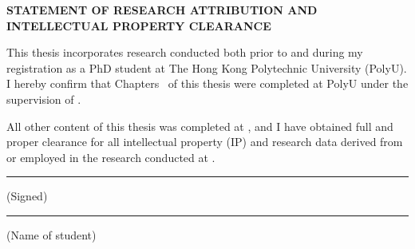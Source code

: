 \thispagestyle{empty}
\begin{center}
  \vspace*{8mm}
  {\Large\rmfamily\bfseries STATEMENT OF RESEARCH ATTRIBUTION AND INTELLECTUAL PROPERTY CLEARANCE\par}
\end{center}

\vspace{14mm}

This thesis incorporates research conducted both prior to and during my registration as a PhD student at The Hong Kong Polytechnic University (PolyU). I hereby confirm that Chapters \polyuworkchapters\ of this thesis were completed at PolyU under the supervision of \chiefsupervisor.

\vspace{1em}

All other content of this thesis was completed at \previousuniversity, and I have obtained full and proper clearance for all intellectual property (IP) and research data derived from or employed in the research conducted at \previousuniversity.

\vspace{24mm}

\noindent
\begin{minipage}[t]{0.42\textwidth}
  \centering
  \studentsignature\par
  \vspace{1mm}\hrule
  \vspace{1mm}(Signed)
\end{minipage}
\hfill
\begin{minipage}[t]{0.42\textwidth}
  \centering
  \rule{0pt}{16mm}\studentname\par
  \vspace{1mm}\hrule
  \vspace{1mm}(Name of student)
\end{minipage}

\clearpage
